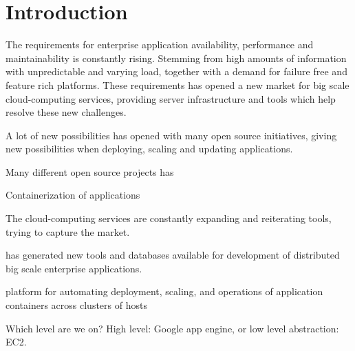 \chapter{Introduction}
\label{ch:introduction}
The requirements for enterprise application availability, performance and maintainability is constantly rising. Stemming from high amounts of information with unpredictable and varying load, together with a demand for failure free and feature rich platforms. These requirements has opened a new market for big scale cloud-computing services, providing server infrastructure and tools which help resolve these new challenges.


A lot of new possibilities has opened with many open source initiatives, giving new possibilities when deploying, scaling and updating applications. 


Many different open source projects has 

Containerization of applications 

The cloud-computing services are constantly expanding and reiterating tools, trying to capture the market.

has generated new tools and databases available for development of distributed big scale enterprise applications.






platform for automating deployment, scaling, and operations of application containers across clusters of hosts


Which level are we on? High level: Google app engine, or low level abstraction: EC2.